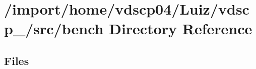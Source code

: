 \section{/import/home/vdscp04/\+Luiz/vdscp\+\_/src/bench Directory Reference}
\label{dir_26fad5f386d661d9ea1c9196bfeaaa16}
\subsection*{Files}
\begin{DoxyCompactItemize}
\end{DoxyCompactItemize}
